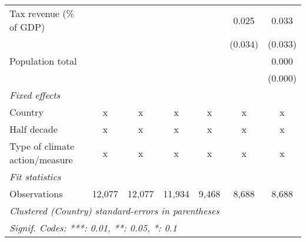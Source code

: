 \begin{tabular}{lcccccc}
   Tax revenue (\% of GDP)                  &              &              &                &               & 0.025         & 0.033\\   
                                            &              &              &                &               & (0.034)       & (0.033)\\   
   Population total                         &              &              &                &               &               & 0.000\\   
                                            &              &              &                &               &               & (0.000)\\   
   \emph{Fixed effects}\\
   Country                                  & x            & x            & x              & x             & x             & x\\  
   Half decade                              & x            & x            & x              & x             & x             & x\\  
   Type of climate action/measure           & x            & x            & x              & x             & x             & x\\  
   \midrule \emph{Fit statistics}\\
   Observations                             & 12,077       & 12,077       & 11,934         & 9,468         & 8,688         & 8,688\\  
   \midrule
   \multicolumn{7}{l}{\emph{Clustered (Country) standard-errors in parentheses}}\\
   \multicolumn{7}{l}{\emph{Signif. Codes: ***: 0.01, **: 0.05, *: 0.1}}\\
\end{tabular}
\par\endgroup


